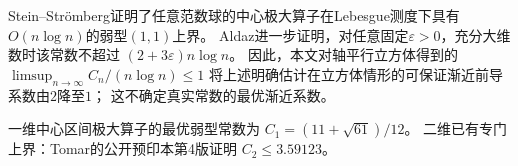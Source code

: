 Stein--Str\"omberg证明了任意范数球的中心极大算子在Lebesgue测度下具有
$O(n\log n)$的弱型$(1,1)$上界\cite[Theorem~1]{SteinStromberg1983}。
Aldaz进一步证明，对任意固定$\varepsilon>0$，充分大维数时该常数不超过
$(2+3\varepsilon)n\log n$\cite[Theorem~5.2]{Aldaz2017Covering}。
因此，本文对轴平行立方体得到的$\limsup_{n\to\infty}C_n/(n\log n)\le1$
将上述明确估计在立方体情形的可保证渐近前导系数由$2$降至$1$；
这不确定真实常数的最优渐近系数。

一维中心区间极大算子的最优弱型常数为
$C_1=(11+\sqrt{61})/12$\cite[Corollary~1]{Melas2003}。
二维已有专门上界：Tomar的公开预印本第4版证明
$C_2\le3.59123$\cite[Theorem~1.2]{Tomar2026Squares}。

